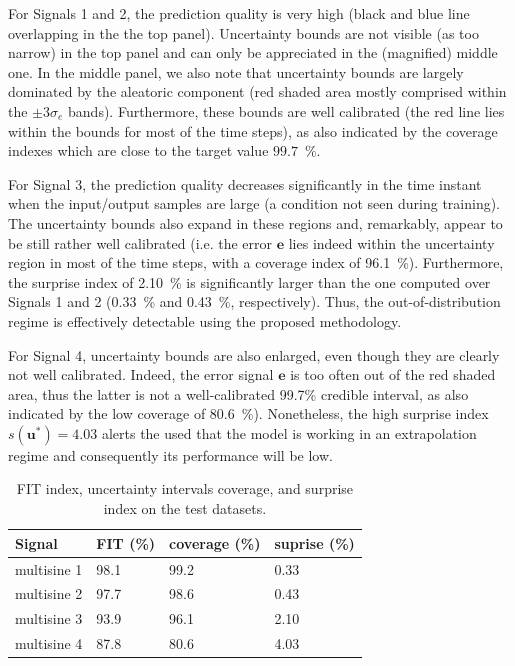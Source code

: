 \documentclass{ifacconf}
\newcommand{\tvec}[1]{{\mathbf{#1}}}
\begin{document}
For Signals 1 and 2, the prediction quality is very high (black and blue line overlapping in the the top panel). Uncertainty bounds are not visible (as too narrow) in the top panel and can only be appreciated in the (magnified) middle one. In the middle panel, we also note that uncertainty bounds are largely dominated by the aleatoric component (red shaded area mostly comprised within the $\pm 3 \sigma_e$ bands). Furthermore, these bounds are well calibrated (the red line lies within the bounds for most of the time steps), as also indicated by the coverage indexes which are close to the target value $99.7$~\%.


For Signal 3, the prediction quality decreases significantly in the time instant when the input/output samples are large (a condition not seen during training). The uncertainty bounds also expand in these regions and, remarkably, appear to be still rather well calibrated (i.e. the error $\tvec{e}$ lies indeed within the uncertainty region in most of the time steps, with a coverage index of 96.1~\%). Furthermore, the surprise index of 2.10~\% is significantly larger than the one computed over Signals 1 and 2 (0.33~\% and 0.43~\%, respectively).
Thus, the out-of-distribution regime is effectively detectable using the proposed methodology.

For Signal 4, uncertainty bounds are also enlarged, even though they are clearly not well calibrated. Indeed, the error signal $\tvec{e}$ is 
too often out of the red shaded area, thus the latter is not a well-calibrated 99.7\% credible interval, as also indicated by the low coverage of 80.6~\%). Nonetheless, the high surprise index $s(\tvec{u}^*)=4.03$  alerts the used that the model is working in an extrapolation regime and consequently its performance will be low.

\begin{table}%
    \centering
    \begin{tabular}{|l||l|l|l|}
    \hline
    Signal &  FIT (\%) & coverage (\%) & suprise (\%)\\
    \hline
    multisine 1 &98.1 & 99.2 & 0.33\\
    multisine 2 &97.7 & 98.6 & 0.43\\
    multisine 3 &93.9 & 96.1 & 2.10\\
    multisine 4 &87.8 & 80.6 & 4.03  \\
    \hline
    \end{tabular}
    \caption{FIT index, uncertainty intervals coverage, and surprise index on the test datasets.}
    \label{tab:wh_results}
\end{table}
\end{document}
